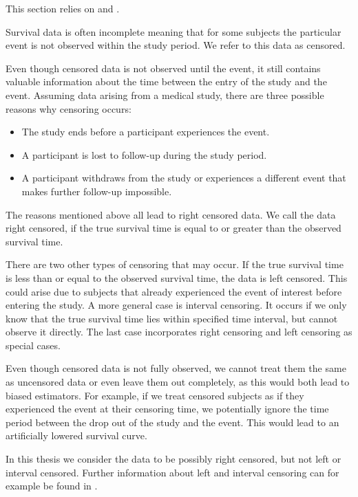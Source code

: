 \documentclass[12pt, a4paper]{article}
\theoremstyle{definition}
\theoremstyle{plain}
\numberwithin{equation}{section}
\numberwithin{figure}{section}
\numberwithin{table}{section}
\begin{document}
	This section relies on \citet*{sabook} and \citet*{mathsabook}.
	
	Survival data is often incomplete meaning that for some subjects the particular event is not observed within the study period. 
	We refer to this data as censored.
	
	Even though censored data is not observed until the event, it still contains valuable information about the time between the entry of the study and the event.
	Assuming data arising from a medical study, there are three possible reasons why censoring occurs:
	\begin{itemize}
		\item The study ends before a participant experiences the event.
		\item A participant is lost to follow-up during the study period. %
		\item A participant withdraws from the study or experiences a different event that makes further follow-up impossible.
	\end{itemize}

	The reasons mentioned above all lead to right censored data.
	We call the data right censored, if the true survival time is equal to or greater than the observed survival time.
	
	There are two other types of censoring that may occur.
	If the true survival time is less than or equal to the observed survival time, the data is left censored.
	This could arise due to subjects that already experienced the event of interest before entering the study.
	A more general case is interval censoring. It occurs if we only know that the true survival time lies within specified time interval, but cannot observe it directly.
	The last case incorporates right censoring and left censoring as special cases.
	
	Even though censored data is not fully observed, we cannot treat them the same as uncensored data or even leave them out completely, as this would both lead to biased estimators.
	For example, if we treat censored subjects as if they experienced the event at their censoring time, we potentially ignore the time period between the drop out of the study and the event.
	This would lead to an artificially lowered survival curve.
		
	In this thesis we consider the data to be possibly right censored, but not left or interval censored.
	Further information about left and interval censoring can for example be found in \citet*{bookfailuretime}.
	
\end{document}
